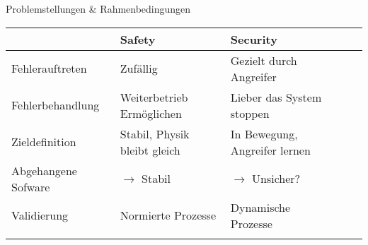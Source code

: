 \begin{frame}[T]{Problemstellungen \& Rahmenbedingungen}
\small

	\begin{table}[]
	\begin{tabular}{l|llll}
	                    & \textbf{Safety}              & \textbf{Security}              \\
	\hline
	Fehlerauftreten     & Zufällig                     & Gezielt durch Angreifer        \\
	Fehlerbehandlung    & Weiterbetrieb Ermöglichen    & Lieber das System stoppen      \\
	Zieldefinition      & Stabil, Physik bleibt gleich & In Bewegung, Angreifer lernen  \\
	Abgehangene Sofware & $\rightarrow$ Stabil         & $\rightarrow$ Unsicher?        \\
	Validierung         & Normierte Prozesse           & Dynamische Prozesse            \\
	                    &                              &
	\end{tabular}
	\end{table}


\end{frame}
